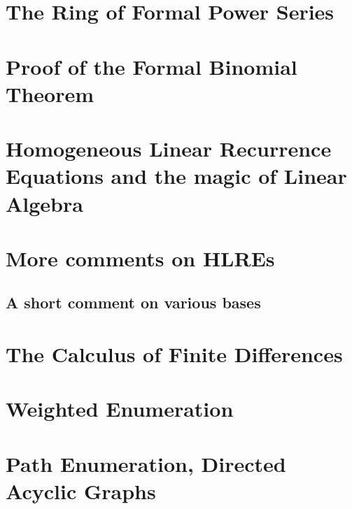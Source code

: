 




\section{The Ring of Formal Power Series}

\section{Proof of the Formal Binomial Theorem}



\section{Homogeneous Linear Recurrence Equations and the magic of Linear Algebra}

\section{More comments on HLREs}

\subsection{A short comment on various bases}

\section{The Calculus of Finite Differences}

\section{Weighted Enumeration}

\section{Path Enumeration, Directed Acyclic Graphs}

